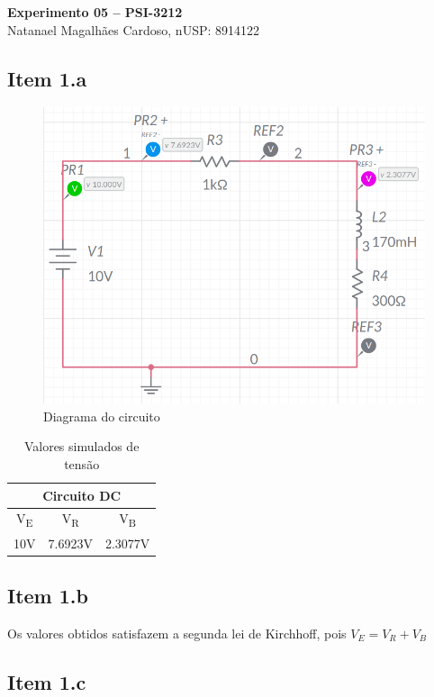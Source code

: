 \documentclass[11pt]{article}
\begin{document}
\begin{center}
  \textbf{Experimento 05 -- PSI-3212} \\
  Natanael Magalhães Cardoso, nUSP: 8914122
\end{center}

\vspace{5mm}

\subsection*{Item 1.a}

\begin{figure}[h!]
  \centering
  \includegraphics[width=.62\textwidth]{fig/1a}
  \caption{Diagrama do circuito}
\end{figure}

\begin{table}[h!]
  \centering
  \begin{tabular}{|c|c|c|}
    \hline
    \multicolumn{3}{|c|}{Circuito DC}                            \\
    \hline
    V\textsubscript{E} & V\textsubscript{R} & V\textsubscript{B} \\
    \hline
    10V                & 7.6923V            & 2.3077V            \\
    \hline
  \end{tabular}
  \caption{Valores simulados de tensão}
\end{table}

\subsection*{Item 1.b}

Os valores obtidos satisfazem a segunda lei de Kirchhoff, pois
$ V_{E} = V_{R} + V_{B} $

\subsection*{Item 1.c}
\end{document}
